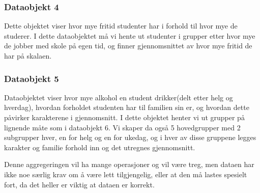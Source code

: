 \subsubsection{Dataobjekt 4}
Dette objektet viser hvor mye fritid studenter har i forhold til hvor mye de studerer. I dette dataobjektet må vi hente ut studenter i grupper etter hvor mye de jobber med skole på egen tid, og finner gjennomsnittet av hvor mye fritid de har på skalaen.

\subsubsection{Dataobjekt 5}
Dataobjektet viser hvor mye alkohol en student drikker(delt etter helg og hverdag), hvordan forholdet studenten har til familien sin er, og hvordan dette påvirker karakterene i gjennomsnitt. I dette objektet henter vi ut grupper på lignende måte som i dataobjekt 6. Vi skaper da også 5 hovedgrupper med 2 subgrupper hver, en for helg og en for ukedag, og i hver av disse gruppene legges karakter og familie forhold inn og det utregnes gjennomsnitt. 

Denne aggregeringen vil ha mange operasjoner og vil være treg, men dataen har ikke noe særlig krav om å være lett tilgjengelig, eller at den må lastes spesielt fort, da det heller er viktig at dataen er korrekt.